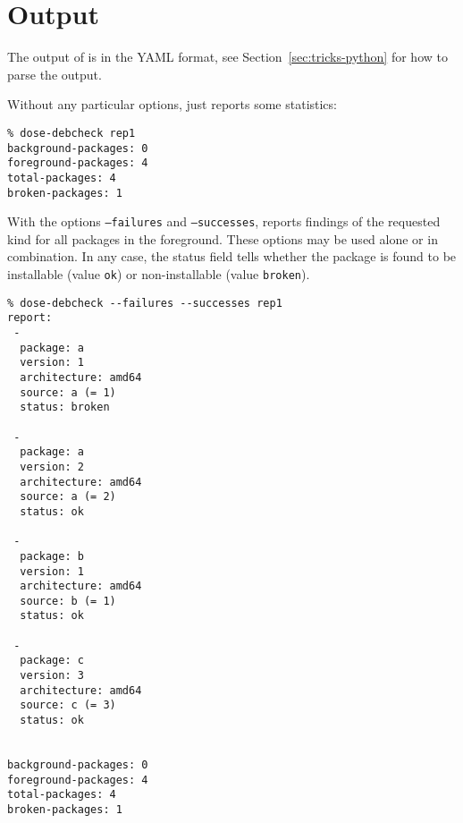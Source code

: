 
\section{Output}
\label{sec:output}
The output of \debcheck{} is in the YAML format, see
Section~\ref{sec:tricks-python} for how to parse the output.

Without any particular options, \debcheck{} just reports some
statistics:
\begin{example}
\begin{verbatim}
% dose-debcheck rep1
background-packages: 0
foreground-packages: 4
total-packages: 4
broken-packages: 1
\end{verbatim}
\end{example}

With the options \texttt{--failures} and \texttt{--successes}, \debcheck{}
reports findings of the requested kind for all packages in the foreground.
These options may be used alone or in combination. In any case, the status
field tells whether the package is found to be installable (value \texttt{ok})
or non-installable (value \texttt{broken}).

\begin{example}
\begin{verbatim}
% dose-debcheck --failures --successes rep1
report:
 -
  package: a
  version: 1
  architecture: amd64
  source: a (= 1)
  status: broken
  
 -
  package: a
  version: 2
  architecture: amd64
  source: a (= 2)
  status: ok
  
 -
  package: b
  version: 1
  architecture: amd64
  source: b (= 1)
  status: ok
  
 -
  package: c
  version: 3
  architecture: amd64
  source: c (= 3)
  status: ok
  
 
background-packages: 0
foreground-packages: 4
total-packages: 4
broken-packages: 1
\end{verbatim}
\end{example}

